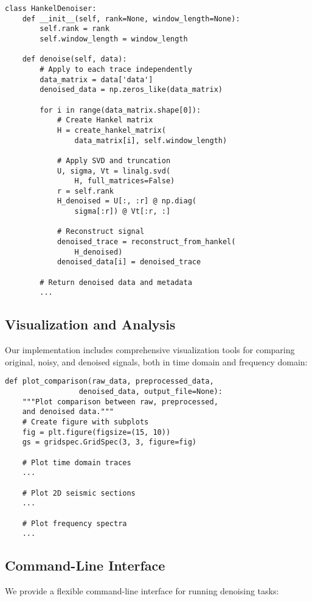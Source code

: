 \documentclass[11pt]{article}
\begin{document}
\begin{lstlisting}
class HankelDenoiser:
    def __init__(self, rank=None, window_length=None):
        self.rank = rank
        self.window_length = window_length
    
    def denoise(self, data):
        # Apply to each trace independently
        data_matrix = data['data']
        denoised_data = np.zeros_like(data_matrix)
        
        for i in range(data_matrix.shape[0]):
            # Create Hankel matrix
            H = create_hankel_matrix(
                data_matrix[i], self.window_length)
            
            # Apply SVD and truncation
            U, sigma, Vt = linalg.svd(
                H, full_matrices=False)
            r = self.rank
            H_denoised = U[:, :r] @ np.diag(
                sigma[:r]) @ Vt[:r, :]
            
            # Reconstruct signal
            denoised_trace = reconstruct_from_hankel(
                H_denoised)
            denoised_data[i] = denoised_trace
        
        # Return denoised data and metadata
        ...
\end{lstlisting}

\subsection{Visualization and Analysis}
Our implementation includes comprehensive visualization tools for comparing original, noisy, and denoised signals, both in time domain and frequency domain:

\begin{lstlisting}
def plot_comparison(raw_data, preprocessed_data, 
                 denoised_data, output_file=None):
    """Plot comparison between raw, preprocessed, 
    and denoised data."""
    # Create figure with subplots
    fig = plt.figure(figsize=(15, 10))
    gs = gridspec.GridSpec(3, 3, figure=fig)
    
    # Plot time domain traces
    ...
    
    # Plot 2D seismic sections
    ...
    
    # Plot frequency spectra
    ...
\end{lstlisting}

\subsection{Command-Line Interface}
We provide a flexible command-line interface for running denoising tasks:
\end{document}
